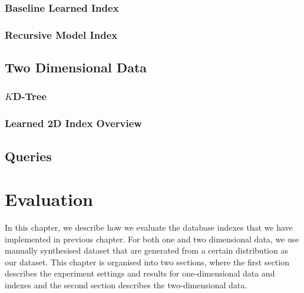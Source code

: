 \documentclass[a4paper,12pt]{scrreprt}
\newenvironment{mscsummary}{\fbox{Summary}}{\medskip}
\begin{document}


\subsection{Baseline Learned Index}



\subsection{Recursive Model Index}



\section{Two Dimensional Data}
\label{sec:two-dim-implementation}

\subsection{$K$D-Tree}



\subsection{Learned 2D Index Overview}



\section{Queries}
\label{sec:queries-implementation}



\chapter{Evaluation}

\begin{mscsummary}
	In this chapter, we describe how we evaluate the database indexes that we have implemented in previous chapter. For both one and two dimensional data, we use manually synthesised dataset that are generated from a certain distribution as our dataset. This chapter is organised into two sections, where the first section describes the experiment settings and results for one-dimensional data and indexes and the second section describes the two-dimensional data.
\end{mscsummary}
\end{document}
